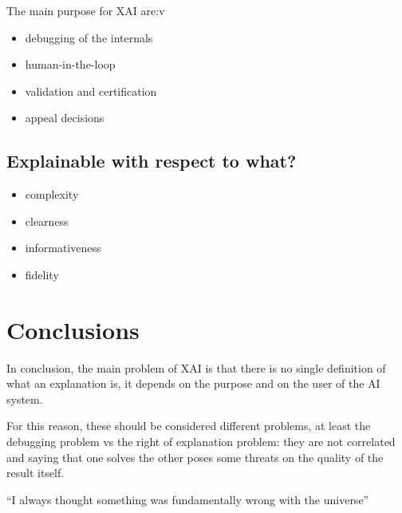 \documentclass[conference]{IEEEtran}
\begin{document}
The main purpose for XAI are:v

\begin{itemize}
    \item debugging of the internals
    \item human-in-the-loop
    \item validation and certification
    \item appeal decisions
\end{itemize}

\subsection{Explainable with respect to what?}

\begin{itemize}
    \item complexity
    \item clearness
    \item informativeness
    \item fidelity
\end{itemize}



\section{Conclusions}
\label{sec:conclusions}

In conclusion, the main problem of XAI is that there is no single definition of
what an explanation is, it depends on the purpose and on the user of the AI
system.

For this reason, these should be considered different problems, at least the
debugging problem vs the right of explanation problem: they are not correlated
and saying that one solves the other poses some threats on the quality of the
result itself.

``I always thought something was fundamentally wrong with the universe''



\end{document}
